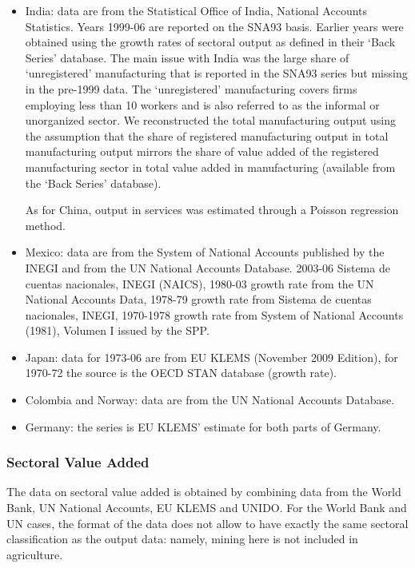 \documentclass[12pt]{article}
\begin{document}
\begin{itemize}
\item India: data are from the Statistical Office of India, National
Accounts Statistics. Years 1999-06 are reported on the SNA93 basis. Earlier
years were obtained using the growth rates of sectoral output as defined in
their `Back Series' database. The main issue with India was the large share
of `unregistered' manufacturing that is reported in the SNA93 series but
missing in the pre-1999 data. The `unregistered' manufacturing covers firms
employing less than 10 workers and is also referred to as the informal or
unorganized sector. We reconstructed the total manufacturing output using
the assumption that the share of registered manufacturing output in total
manufacturing output mirrors the share of value added of the registered
manufacturing sector in total value added in manufacturing (available from
the `Back Series' database).

As for China, output in services was estimated through a Poisson regression
method.

\item Mexico: data are from the System of National Accounts published by the
INEGI and from the UN National Accounts Database. 2003-06 Sistema de cuentas
nacionales, INEGI (NAICS), 1980-03 growth rate from the UN National Accounts
Data, 1978-79 growth rate from Sistema de cuentas nacionales, INEGI,
1970-1978 growth rate from System of National Accounts (1981), Volumen I
issued by the SPP.

\item Japan: data for 1973-06 are from EU KLEMS (November 2009 Edition), for
1970-72 the source is the OECD STAN database (growth rate).

\item Colombia and Norway: data are from the UN National Accounts Database.

\item Germany: the series is EU KLEMS' estimate for both parts of Germany.
\end{itemize}

\subsubsection{Sectoral Value Added}

The data on sectoral value added is obtained by combining data from the
World Bank, UN National Accounts, EU KLEMS and UNIDO. For the World Bank and
UN cases, the format of the data does not allow to have exactly the same
sectoral classification as the output data: namely, mining here is not
included in agriculture.
\end{document}

